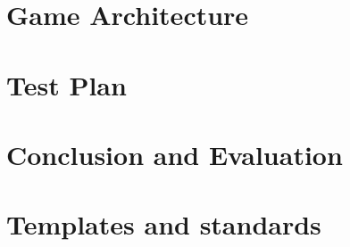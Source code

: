 \documentclass[11pt, a4paper]{article}
\begin{document}
\clearpage
\section{Game Architecture}

\clearpage

\clearpage

\clearpage

\clearpage


\newpage
\section{Test Plan}



\clearpage

\clearpage

\clearpage


\clearpage

\clearpage

\clearpage

\clearpage


\newpage
\section{Conclusion and Evaluation}




\newpage
\section{Templates and standards}



\newpage

\end{document}
